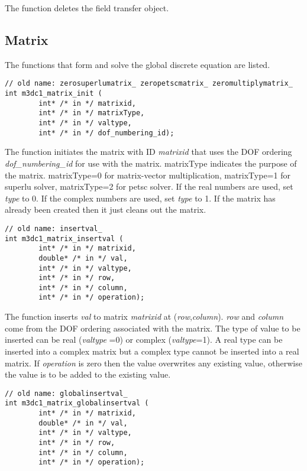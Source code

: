 The function deletes the field transfer object.
\subsection{Matrix}
The functions that form and solve the global discrete equation are listed.
\begin{verbatim}
// old name: zerosuperlumatrix_ zeropetscmatrix_ zeromultiplymatrix_
int m3dc1_matrix_init (
        int* /* in */ matrixid,
        int* /* in */ matrixType,
        int* /* in */ valtype,  
        int* /* in */ dof_numbering_id); 
\end{verbatim}\vspace{-.5cm}\hspace{1cm}

The function initiates  the matrix with ID \textit{matrixid} that uses the DOF ordering \textit{dof\_numbering\_id} 
	       for use with the matrix.
	       matrixType indicates the purpose of the matrix. matrixType=0 for matrix-vector multiplication, matrixType=1 for superlu solver, matrixType=2 for petsc solver.
	       If the real numbers are 	used,  set \textit{type} to 0.
	       If the complex numbers are used,  set \textit{type} to 1. 
	       If the matrix has already been created then it just cleans out the matrix.

	       
\begin{verbatim}
// old name: insertval_
int m3dc1_matrix_insertval (
        int* /* in */ matrixid, 
        double* /* in */ val, 
        int* /* in */ valtype, 
        int* /* in */ row,
        int* /* in */ column, 
        int* /* in */ operation); 
\end{verbatim}\vspace{-.5cm}\hspace{1cm}

The function inserts \textit{val} to matrix \textit{matrixid}
	       at (\textit{row},\textit{column}).
	       \textit{row} and \textit{column} come from the DOF ordering associated with the matrix.
	       The type of value to be inserted can be real (\textit{valtype} =0) or complex (\textit{valtype}=1).
	       A real type can be inserted into a complex matrix
	       but a complex type cannot be inserted into a real matrix.
	       If \textit{operation} is zero then the value overwrites any existing value,
	       otherwise the value is to be added to the existing value.

\begin{verbatim}
// old name: globalinsertval_
int m3dc1_matrix_globalinsertval (
        int* /* in */ matrixid, 
        double* /* in */ val, 
        int* /* in */ valtype, 
        int* /* in */ row,
        int* /* in */ column, 
        int* /* in */ operation); 
\end{verbatim}\vspace{-.5cm}\hspace{1cm}

